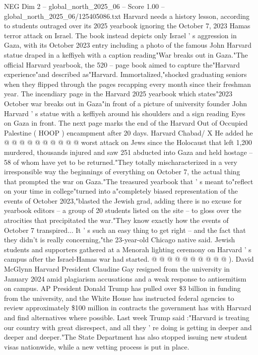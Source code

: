 \begin{textsample}{NEG Dim 2 – global\_north\_2025\_06 – Score 1.00 – global\_north\_2025\_06/125405086.txt}  \label{ex:f2_neg_224}
Harvard needs a history lesson, according to students outraged over its 2025 yearbook ignoring the October 7, 2023 Hamas terror attack on Israel.
The book instead depicts only Israel ' s aggression in Gaza, with its October 2023 entry including a photo of the famous John Harvard statue draped in a keffiyeh with a caption reading"War breaks out in Gaza."The official Harvard yearbook, the 520 -- page book aimed to capture the"Harvard experience"and described as"Harvard.
Immortalized,"shocked graduating seniors when they flipped through the pages recapping every month since their freshman year.
The incendiary page in the Harvard 2025 yearbook which states"2023 October war breaks out in Gaza"in front of a picture of university founder John Harvard ' s statue with a keffiyeh around his shoulders and a sign reading Eyes on Gaza in front.
The next page marks the end of the Harvard Out of Occupied Palestine ( HOOP ) encampment after 20 days.
Harvard Chabad/ X He added he @ @ @ @ @ @ @ @ @ @ worst attack on Jews since the Holocaust that left 1,200 murdered, thousands injured and saw 251 abducted into Gaza and held hostage -- 58 of whom have yet to be returned."They totally mischaracterized in a very irresponsible way the beginnings of everything on October 7, the actual thing that prompted the war on Gaza."The treasured yearbook that ' s meant to"reflect on your time in college"turned into a"completely biased representation of the events of October 2023,"blasted the Jewish grad, adding there is no excuse for yearbook editors -- a group of 20 students listed on the site -- to gloss over the atrocities that precipitated the war."They know exactly how the events of October 7 transpired...
It ' s such an easy thing to get right -- and the fact that they didn't is really concerning,"the 23-year-old Chicago native said.
Jewish students and supporters gathered at a Menorah lighting ceremony on Harvard ' s campus after the Israel-Hamas war had started. @ @ @ @ @ @ @ @ @ @ ).
David McGlynn Harvard President Claudine Gay resigned from the university in January 2024 amid plagiarism accusations and a weak response to antisemitism on campus.
AP President Donald Trump has pulled over \$3 billion in funding from the university, and the White House has instructed federal agencies to review approximately \$100 million in contracts the government has with Harvard and find alternatives where possible.
Last week Trump said :"Harvard is treating our country with great disrespect, and all they ' re doing is getting in deeper and deeper and deeper."The State Department has also stopped issuing new student visas nationwide, while a new vetting process is put in place.

\end{textsample}
